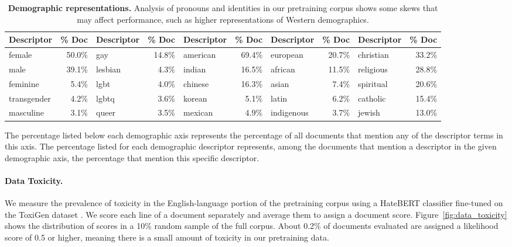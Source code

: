 \documentclass{article}
\begin{document}
\begin{table}[htbp]
\begin{subtable}{\textwidth}
\begin{small}
\begin{tabular}{lrlrlrlrlr}
        \textbf{Descriptor} & \multicolumn{1}{l}{\textbf{\% Doc}} & \textbf{Descriptor} & \multicolumn{1}{l}{\textbf{\% Doc}} & \textbf{Descriptor} & \multicolumn{1}{l}{\textbf{\% Doc}} & \textbf{Descriptor} & \multicolumn{1}{l}{\textbf{\% Doc}} & \textbf{Descriptor} & \multicolumn{1}{l}{\textbf{\% Doc}} \\
        \midrule
        female & 50.0\% & gay & 14.8\% & american & 69.4\% & european & 20.7\% & christian & 33.2\% \\
        male & 39.1\% & lesbian & 4.3\% & indian & 16.5\% & african & 11.5\% & religious & 28.8\% \\
        feminine & 5.4\% & lgbt & 4.0\% & chinese & 16.3\% & asian & 7.4\% & spiritual & 20.6\% \\
        transgender & 4.2\% & lgbtq & 3.6\% & korean & 5.1\% & latin & 6.2\% & catholic & 15.4\% \\
        masculine & 3.1\% & queer & 3.5\% & mexican & 4.9\% & indigenous & 3.7\% & jewish & 13.0\% \\
        \bottomrule
        \end{tabular}
        \end{small}
        \caption{The percentage listed below each demographic axis represents the percentage of all documents that mention any of the descriptor terms in this axis. The percentage listed for each demographic descriptor represents, among the documents that mention a descriptor in the given demographic axis, the percentage that mention this specific descriptor. }
        \label{tab:holisticbias_freqs}
    \end{subtable}
    \caption{\textbf{Demographic representations.} Analysis of pronouns and identities in our pretraining corpus shows some skews that may affect performance, such as higher representations of Western demographics.}
    \label{tab:demographic_representations}
\end{table}

\paragraph{Data Toxicity.} We measure the prevalence of toxicity in the English-language portion of the pretraining corpus using a HateBERT classifier fine-tuned on the ToxiGen dataset \citep{hartvigsen2022toxigen}. We score each line of a document separately and average them to assign a document score. Figure~\ref{fig:data_toxicity} shows the distribution of scores in a 10\% random sample of the full corpus. About 0.2\% of documents evaluated are assigned a likelihood score of 0.5 or higher, meaning there is a small amount of toxicity in our pretraining data. 
\end{document}
